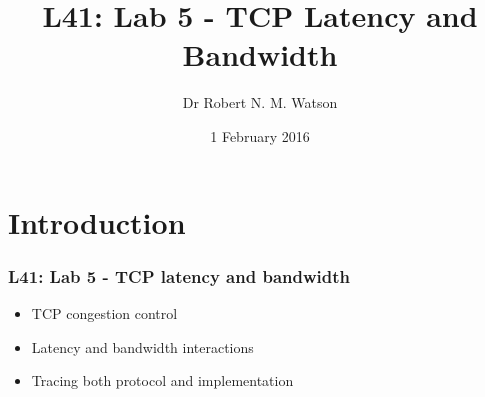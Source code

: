 
{
}

\usepackage[english]{babel}
\usepackage[latin1]{inputenc}
\usepackage{graphicx}
\usepackage{times}
\usepackage[T1]{fontenc}
\usepackage{fancyvrb}
\usepackage{hyperref}
\usepackage{listings}


\def\Tiny{\fontsize{4pt}{4pt} \selectfont}

\title{L41: Lab 5 - TCP Latency and Bandwidth}
\author{Dr Robert N. M. Watson}
\date{1 February 2016}

\begin{frame}
  \titlepage
\end{frame}

\section{Introduction}

\begin{frame}
  \frametitle{L41: Lab 5 - TCP latency and bandwidth}

  \begin{itemize}
    \item TCP congestion control
    \item Latency and bandwidth interactions
    \item Tracing both protocol and implementation
  \end{itemize}
\end{frame}

